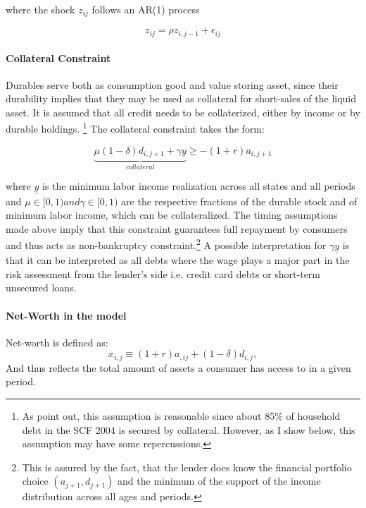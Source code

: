 \documentclass[12pt,a4paper,leqno]{article}
\theoremstyle{definition}
\begin{document}
where the shock $z_{ij}$ follows an AR(1) process

\begin{equation}\label{eq:ar1_shock}
z_{ij} = \rho z_{i,j-1}+\epsilon_{ij}
\end{equation}


\paragraph{Collateral Constraint}
Durables serve both as consumption good and value storing asset, since their durability implies that they may be used as collateral for short-sales of the liquid asset. It is assumed that all credit needs to be collaterized, either by income or by durable holdings. \footnote{As \citep{hintermaier2010} point out, this assumption is reasonable since about 85\% of household debt in the SCF 2004 is secured by collateral. However, as I show below, this assumption may have some repercussions.} The collateral constraint takes the form:

\begin{equation}\label{eq:borrowing_constraint}
\underbrace{\mu(1-\delta)d_{i,j+1} + \gamma\underline{y}}_{collateral} \geq -(1+r)a_{i,j+1}
\end{equation}

where $\underline{y}$ is the minimum labor income realization across all states and all periods and $\mu \in [0,1) and \gamma \in [0,1)$ are the respective fractions of the durable stock and of minimum labor income, which can be collateralized. The timing assumptions made above imply that this constraint guarantees full repayment by consumers and thus acts as non-bankruptcy constraint.\footnote{This is assured by the fact, that the lender does know the financial portfolio choice $(a_{j+1},d_{j+1})$ and the minimum of the support of the income distribution across all ages and periods.} A possible interpretation for $\gamma\underline{y}$ is that it can be interpreted as all debts where the wage plays a major part in the risk assessment from the lender's side i.e. credit card debts or short-term unsecured loans. 


\paragraph{Net-Worth in the model} 
Net-worth is defined as:
\begin{equation}\label{eq:net_worth}
x_{i,j} \equiv (1+r)a_{,ij} + (1-\delta)d_{i,j},
\end{equation}
And thus reflects the total amount of assets a consumer has access to in a given period.
\end{document}
